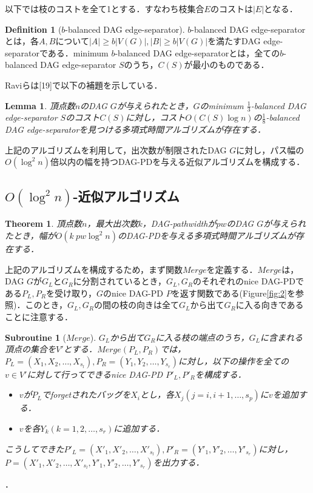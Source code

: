 \documentclass[master]{kuisthesis}		%
\theoremstyle{plain}
\newtheorem{theorem}{Theorem}
\newtheorem{subroutine}{Subroutine}
\newtheorem{lemma}{Lemma}
\theoremstyle{definition}
\newtheorem{definition*}{Definition}
\begin{document}
以下では枝のコストを全て1とする．すなわち枝集合$E$のコストは$|E|$となる．

\begin{definition*}[$b$-balanced DAG edge-separator]
    $b$-balanced DAG edge-separatorとは，各$A, B$について$|A| \geq b|V(G)|, |B| \geq b|V(G)|$を満たすDAG edge-separatorである．minimum $b$-balanced DAG edge-separatorとは，全ての$b$-balanced DAG edge-separator $S$のうち，$C(S)$が最小のものである．
\end{definition*}

Raviらは[19]で以下の補題を示している．

\begin{lemma}\label{separator_algorithm}
    頂点数$n$のDAG $G$が与えられたとき，$G$のminimum $\frac{1}{3}$-balanced DAG edge-separator $S$のコスト$C(S)$に対し，コスト$O(C(S) \log n)$の$\frac{1}{8}$-balanced DAG edge-separatorを見つける多項式時間アルゴリズムが存在する．
\end{lemma}

上記のアルゴリズムを利用して，出次数が制限されたDAG $G$に対し，パス幅の$O(\log ^2 n)$倍以内の幅を持つDAG-PDを与える近似アルゴリズムを構成する．



\subsection{$O(\log ^2 n)$-近似アルゴリズム}

\begin{theorem}\label{approximation}
    頂点数$n$，最大出次数$k$，DAG-pathwidthが$pw$のDAG $G$が与えられたとき，幅が$O(k \ pw \log ^2 n)$のDAG-PDを与える多項式時間アルゴリズムが存在する．
\end{theorem}

上記のアルゴリズムを構成するため，まず関数$Merge$を定義する．$Merge$は，DAG $G$が$G_L$と$G_R$に分割されているとき，$G_L, G_R$のそれぞれのnice DAG-PDである$P_L, P_R$を受け取り，$G$のnice DAG-PD $P$を返す関数である(Figure\ref{fig:2}を参照)．このとき，$G_L, G_R$の間の枝の向きは全て$G_L$から出て$G_R$に入る向きであることに注意する．

\begin{subroutine}[$Merge$]
    $G_L$から出て$G_R$に入る枝の端点のうち，$G_L$に含まれる頂点の集合を$V'$とする．$Merge(P_L, P_R)$では，$P_L=(X_1, X_2, \dots , X_{s_l}), P_R=(Y_1, Y_2, \dots , Y_{s_r})$に対し，以下の操作を全ての$v \in V'$に対して行ってできるnice DAG-PD $P'_L, P'_R$を構成する．
    \begin{itemize}
      \item $v$が$P_L$でforgetされたバッグを$X_i$とし，各$X_j (j=i, i+1, \dots , s_p)$に$v$を追加する．
      \item $v$を各$Y_k (k=1, 2, \dots , s_r)$に追加する．
    \end{itemize}
    こうしてできた$P'_L=(X'_1, X'_2, \dots , X'_{s_l}), P'_R=(Y'_1, Y'_2, \dots , Y'_{s_r})$に対し，$P=(X'_1, X'_2, \dots , X'_{s_l}, Y'_1, Y'_2, \dots , Y'_{s_r})$を出力する．
\end{subroutine}．
\end{document}
